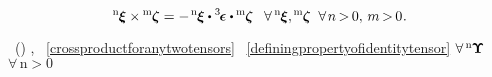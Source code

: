 \nopagebreak\vspace{-0.2em}\begin{equation}\label{crossproductforanytwotensors}
{^\mathrm{n}\hspace{-0.12ex}\bm{\xi}} \times \hspace{-0.12ex} {^\mathrm{m}\hspace{-0.12ex}\bm{\zeta}}
=
- \hspace{.25ex} {^\mathrm{n}\hspace{-0.12ex}\bm{\xi}} \dotp \permutationsparitytensor \dotp \hspace{-0.1ex} {^\mathrm{m}\hspace{-0.12ex}\bm{\zeta}}
\;\;\:
%
\forall \hspace{.4ex} {^\mathrm{n}\hspace{-0.12ex}\bm{\xi}} ,
\hspace{-0.12ex} {^\mathrm{m}\hspace{-0.12ex}\bm{\zeta}}
\;\;
\forall \hspace{.25ex} n \hspace{-0.25ex} > \hspace{-0.25ex} 0 , \,
m \hspace{-0.25ex} > \hspace{-0.25ex} 0
\hspace{.1ex} .
\end{equation}

\vspace{-0.1em}\noindent
{}\ru{\:---} ~() , ~\eqref{crossproductforanytwotensors} ~\eqref{definingpropertyofidentitytensor} ${\forall \, {^\mathrm{n}\hspace{-0.12ex}\bm{\Upsilon}}}$ ${\forall \,\mathrm{n \!>\! 0}}$

